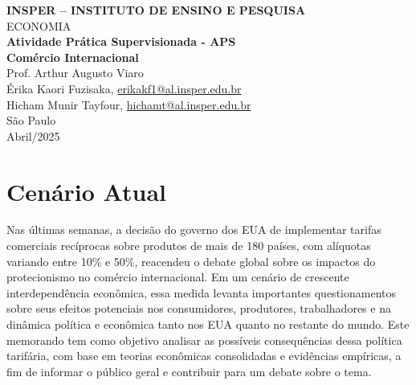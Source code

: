 \documentclass[a4paper,12pt]{article}[abntex2]
\begin{document}
\begin{titlepage}
    \centering
    \vspace*{1cm}
    \Large\textbf{INSPER – INSTITUTO DE ENSINO E PESQUISA}\\
    \Large ECONOMIA\\
    \vspace{1.5cm}
    \Large\textbf{Atividade Prática Supervisionada - APS}\\
    \textbf{Comércio Internacional}\\
    \vspace{1.5cm}
    Prof. Arthur Augusto Viaro\\
    \vfill
    \normalsize
    Érika Kaori Fuzisaka, \href{mailto:erikakf1@al.insper.edu.br}{erikakf1@al.insper.edu.br}\\
    Hicham Munir Tayfour, \href{mailto:hichamt@al.insper.edu.br}{hichamt@al.insper.edu.br}\\

    \vfill
    São Paulo\\
    Abril/2025
\end{titlepage}

\newpage
\tableofcontents
\thispagestyle{empty} %

\newpage 
\listoffigures
\thispagestyle{empty} %

\newpage
\listoftables
\thispagestyle{empty} %

\newpage
\setcounter{page}{1} %
\justify
\onehalfspacing

\section*{\textbf{Cenário Atual}} %

Nas últimas semanas, a decisão do governo dos EUA de implementar tarifas comerciais recíprocas sobre produtos de mais de 180 países, com alíquotas variando entre 10\% e 50\%, reacendeu o debate global sobre os impactos do protecionismo no comércio internacional. Em um cenário de crescente interdependência econômica, essa medida levanta importantes questionamentos sobre seus efeitos potenciais nos consumidores, produtores, trabalhadores e na dinâmica política e econômica tanto nos EUA quanto no restante do mundo. Este memorando tem como objetivo analisar as possíveis consequências dessa política tarifária, com base em teorias econômicas consolidadas e evidências empíricas, a fim de informar o público geral e contribuir para um debate sobre o tema.
\end{document}
